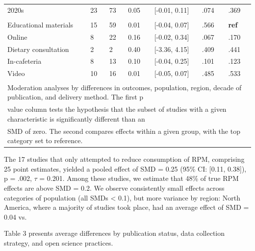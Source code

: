 \documentclass[sn-nature,referee,pdflatex]{sn-jnl}
\begin{document}
\begin{table}[!ht]
\begin{tabular}[t]{lllllll}
\hspace{1em}2020s & 23 & 73 & 0.05 & {}[-0.01, 0.11] & .074 & .369\\
\addlinespace[0.3em]
\multicolumn{7}{l}{\textbf{Method of Delivery}}\\
\hspace{1em}Educational materials & 15 & 59 & 0.01 & {}[-0.04, 0.07] & .566 & \textbf{ref}\\
\hspace{1em}Online & 8 & 22 & 0.16 & {}[-0.02, 0.34] & .067 & .170\\
\hspace{1em}Dietary consultation & 2 & 2 & 0.40 & {}[-3.36, 4.15] & .409 & .441\\
\hspace{1em}In-cafeteria & 8 & 13 & 0.10 & {}[-0.04, 0.25] & .101 & .123\\
\hspace{1em}Video & 10 & 16 & 0.01 & {}[-0.05, 0.07] & .485 & .533\\
\bottomrule
\multicolumn{7}{l}{\textsuperscript{} Moderation analyses by differences in outcomes, population, region, decade of publication, and delivery method. The first p}\\
\multicolumn{7}{l}{value column tests the hypothesis that the subset of studies with a given characteristic is significantly different than an}\\
\multicolumn{7}{l}{SMD of zero. The second compares effects within a given group, with the top category set to reference.}\\
\end{tabular}
\end{table}

The 17 studies that only attempted to reduce consumption of RPM,
comprising 25 point estimates, yielded a pooled effect of SMD = 0.25
(95\% CI: {[}0.11, 0.38{]}), p = .002, \(\tau\) = 0.201. Among these
studies, we estimate that 48\% of true RPM effects are above SMD = 0.2.
We observe consistently small effects across categories of population
(all SMDs \textless{} 0.1), but more variance by region: North America,
where a majority of studies took place, had an average effect of SMD =
0.04 vs.~

Table 3 presents average differences by publication status, data
collection strategy, and open science practices.
\end{document}
